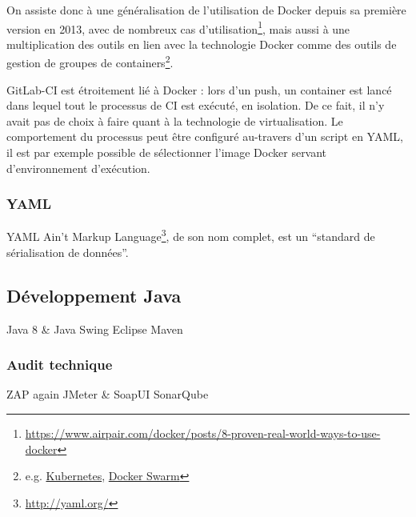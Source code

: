 On assiste donc à une généralisation de l'utilisation de Docker depuis sa première version en 2013, avec de nombreux cas d'utilisation\footnote{\url{https://www.airpair.com/docker/posts/8-proven-real-world-ways-to-use-docker}}, mais aussi à une multiplication des outils en lien avec la technologie Docker comme des outils de gestion de groupes de containers\footnote{e.g. \href{https://kubernetes.io/}{Kubernetes}, \href{https://docs.docker.com/engine/swarm/}{Docker Swarm}}.

GitLab-CI est étroitement lié à Docker : lors d'un push, un container est lancé dans lequel tout le processus de CI est exécuté, en isolation. De ce fait, il n'y avait pas de choix à faire quant à la technologie de virtualisation. Le comportement du processus peut être configuré au-travers d'un script en YAML, il est par exemple possible de sélectionner l'image Docker servant d'environnement d'exécution.

\subsubsection{YAML}
YAML Ain't Markup Language\footnote{\url{http://yaml.org/}}, de son nom complet, est un ``standard de sérialisation de données''.

\subsection{Développement Java}
Java 8 \& Java Swing
Eclipse
Maven
\subsubsection{Audit technique}
ZAP again
JMeter \& SoapUI
SonarQube


